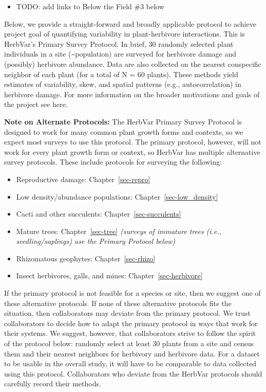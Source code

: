 \documentclass[
  letterpaper,
  DIV=11,
  numbers=noendperiod]{scrreprt}
\providecommand{\tightlist}{%
  \setlength{\itemsep}{0pt}\setlength{\parskip}{0pt}}\usepackage{longtable,booktabs,array}
\begin{document}
\begin{itemize}
\tightlist
\item
  TODO: add links to Below the Field \#3 below
\end{itemize}

Below, we provide a straight-forward and broadly applicable protocol to
achieve project goal of quantifying variability in plant-herbivore
interactions. This is HerbVar's Primary Survey Protocol. In brief, 30
randomly selected plant individuals in a site
(\textasciitilde population) are surveyed for herbivore damage and
(possibly) herbivore abundance. Data are also collected on the nearest
conspecific neighbor of each plant (for a total of N = 60 plants). These
methods yield estimates of variability, skew, and spatial patterns
(e.g., autocorrelation) in herbivore damage. For more information on the
broader motivations and goals of the project see here.

\textbf{Note on Alternate Protocols:} The HerbVar Primary Survey
Protocol is designed to work for many common plant growth forms and
contexts, so we expect most surveys to use this protocol. The primary
protocol, however, will not work for every plant growth form or context,
so HerbVar has multiple alternative survey protocols. These include
protocols for surveying the following:

\begin{itemize}
\tightlist
\item
  Reproductive damage: Chapter~\ref{sec-repro}
\item
  Low density/abundance populations: Chapter~\ref{sec-low_density}
\item
  Cacti and other succulents: Chapter~\ref{sec-succulents}
\item
  Mature trees: Chapter~\ref{sec-tree} \emph{(surveys of immature trees
  (i.e., seedling/saplings) use the Primary Protocol below)}
\item
  Rhizomatous geophytes: Chapter~\ref{sec-rhizo}
\item
  Insect herbivores, galls, and mines: Chapter~\ref{sec-herbivore}
\end{itemize}

If the primary protocol is not feasible for a species or site, then we
suggest one of these alternative protocols. If none of these alternative
protocols fits the situation, then collaborators may deviate from the
primary protocol. We trust collaborators to decide how to adapt the
primary protocol in ways that work for their systems. We suggest,
however, that collaborators strive to follow the spirit of the protocol
below: randomly select at least 30 plants from a site and census them
and their nearest neighbors for herbivory and herbivore data. For a
dataset to be usable in the overall study, it will have to be comparable
to data collected using this protocol. Collaborators who deviate from
the HerbVar protocols should carefully record their methods.
\end{document}
